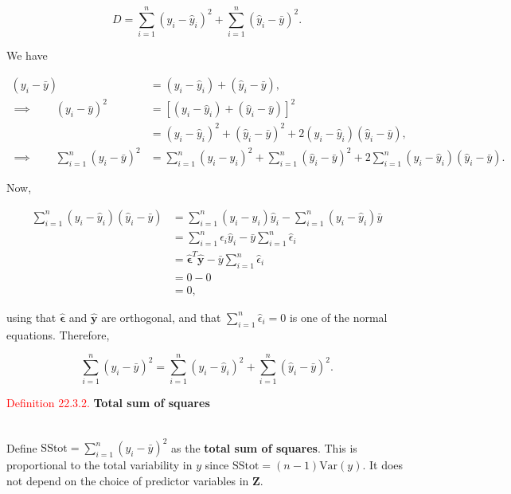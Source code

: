 \documentclass[
]{book}
\begin{document}
\[D =  \sum_{i=1}^n (y_i - \hat{y}_i)^2 + \sum_{i=1}^n (\hat{y}_i - \bar{y})^2.\]

We have

\begin{align*}
(y_i - \bar{y}) &= (y_i - \hat{y}_i) + (\hat{y}_i - \bar{y}), \\[3pt]
\implies \qquad (y_i - \bar{y})^2 &= \left[ (y_i - \hat{y}_i) + (\hat{y}_i - \bar{y}) \right]^2 \\[3pt]
&= (y_i - \hat{y}_i)^2 + (\hat{y}_i - \bar{y})^2 + 2(y_i - \hat{y}_i)(\hat{y}_i - \bar{y}), \\[3pt]
\implies \qquad \sum\limits_{i=1}^n (y_i - \bar{y})^2 &= \sum\limits_{i=1}^n (y_i - \hat{y}_i)^2 + \sum\limits_{i=1}^n (\hat{y}_i - \bar{y})^2 + 2 \sum\limits_{i=1}^n (y_i - \hat{y}_i)(\hat{y}_i - \bar{y}).
\end{align*}

Now,

\begin{align*}
\sum\limits_{i=1}^n (y_i - \hat{y}_i)(\hat{y}_i - \bar{y}) &= \sum\limits_{i=1}^n (y_i - \hat{y}_i )\hat{y}_i - \sum\limits_{i=1}^n (y_i - \hat{y}_i)\bar{y} \\[3pt]
&= \sum\limits_{i=1}^n \hat{\epsilon}_i\hat{y}_i - \bar{y} \sum\limits_{i=1}^n \hat{\epsilon}_i \\[3pt]
&= \hat{\mathbf{\epsilon}}^T \hat{\mathbf{y}} - \bar{y} \sum\limits_{i=1}^n \hat{\epsilon}_i \\[3pt]
&= 0-0 \\[3pt]
&= 0,
\end{align*}

using that \(\hat{\mathbf{\epsilon}}\) and \(\hat{\mathbf{y}}\) are orthogonal, and that \(\sum\limits_{i=1}^n \hat{\epsilon}_i = 0\) is one of the normal equations. Therefore,

\[\sum\limits_{i=1}^n \left(y_i - \bar{y} \right)^2 = \sum\limits_{i=1}^n \left( y_i - \hat{y}_i \right) ^2 + \sum\limits_{i=1}^n \left( \hat{y}_i - \bar{y} \right)^2.\]

\hfill\break

\leavevmode{}%
\textcolor{red}{Definition 22.3.2.}
{\textbf{Total sum of squares}}\\
\strut \\
Define \(\text{SStot} = \sum\limits_{i=1}^n (y_i - \bar{y})^2\) as the {\textbf{total sum of squares}}. This is proportional to the total variability in \(y\) since \(\text{SStot} = (n-1) \text{Var}(y)\). It does not depend on the choice of predictor variables in \(\mathbf{Z}\).
\end{document}
